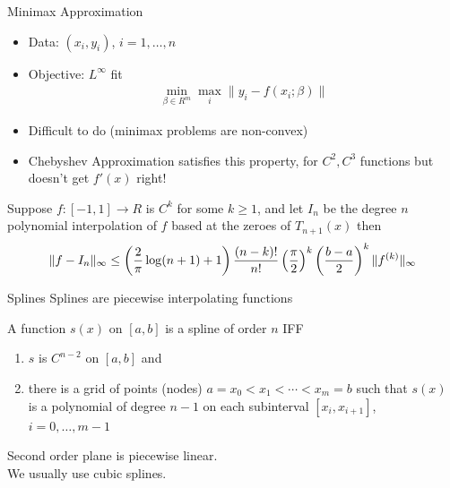 \documentclass[xcolor=pdftex,dvipsnames,table,mathserif,aspectratio=169]{beamer}
\begin{document}
\begin{frame}{Minimax Approximation}
\begin{itemize}
\item Data: $(x_i,y_i)$, $i=1,\ldots,n$
\item Objective: $L^{\infty}$ fit
\begin{eqnarray*}
\min_{\beta \in R^m} \max_{i} \| y_i - f(x_i; \beta) \|
\end{eqnarray*}
\item Difficult to do (minimax problems are non-convex)
\item Chebyshev Approximation satisfies this property, for $C^2,C^3$ functions but doesn't get $f'(x)$ right!
\end{itemize}
\begin{theorem}
Suppose $f: [-1,1] \rightarrow R$ is $C^k$ for some $k \geq 1$, and let $I_n$ be the degree $n$ polynomial interpolation of $f$ based at the zeroes of $T_{n+1}(x)$ then
\begin{eqnarray*}
\tiny
\| f - I_n \|_{\infty} \leq \left(\frac{2}{\pi}  \log(n+1) + 1 \right) \frac{(n-k)!}{n!} \left ( \frac{\pi}{2}\right)^k  \left ( \frac{b-a}{2}\right)^k \| f^{(k)} \|_{\infty}
\end{eqnarray*}
\end{theorem}
\end{frame}


\begin{frame}{Splines}
Splines are piecewise interpolating functions
\begin{definition} 
A function $s(x)$ on $[a,b]$ is a spline of order $n$ IFF
\begin{enumerate}
\item $s$ is $C^{n-2}$ on $[a,b]$ and 
\item there is a grid of points (nodes) $a = x_0 < x_1 < \cdots < x_m = b$ such that $s(x)$ is a polynomial of degree $n-1$ on each subinterval $[x_i, x_{i+1}]$, $i = 0,\ldots,m-1$
\end{enumerate}
\end{definition}
Second order plane is piecewise linear.\\
We usually use cubic splines.
\end{frame}
\end{document}
